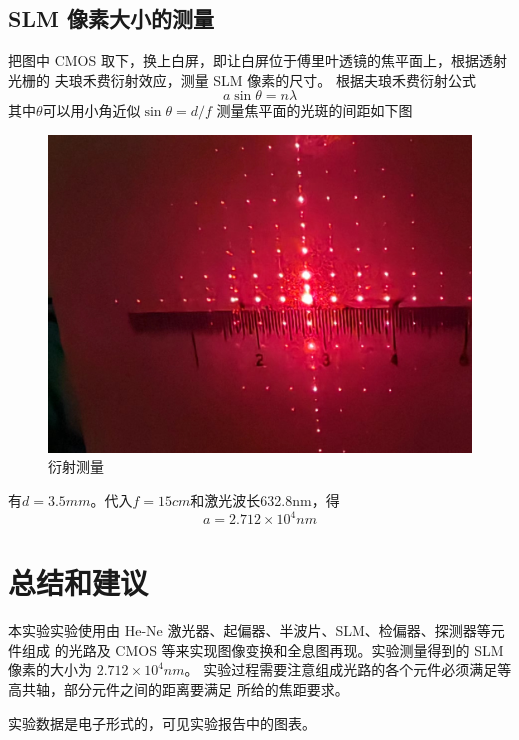 \documentclass[11pt,a4paper]{article}
\begin{document}
\subsection{SLM 像素大小的测量}
把图中 CMOS 取下，换上白屏，即让白屏位于傅里叶透镜的焦平面上，根据透射光栅的
夫琅禾费衍射效应，测量 SLM 像素的尺寸。
根据夫琅禾费衍射公式
\begin{equation}
    a\sin{\theta}=n\lambda
\end{equation}
其中$\theta$可以用小角近似$\sin{\theta}=d/f$
测量焦平面的光斑的间距如下图

\begin{figure}[H]
    \centering
    \includegraphics[width=\textwidth]{衍射测量.jpg}
    \caption{衍射测量}
    \label{fig:diffraction-measurement}
    \end{figure}

有$d=3.5mm$。代入$f=15cm$和激光波长632.8nm，得
\begin{equation}
    a=2.712\times 10^4nm
\end{equation}

\section{总结和建议}
本实验实验使用由 He-Ne 激光器、起偏器、半波片、SLM、检偏器、探测器等元件组成
的光路及 CMOS 等来实现图像变换和全息图再现。实验测量得到的 SLM 像素的大小为
$2.712\times 10^4nm$。
实验过程需要注意组成光路的各个元件必须满足等高共轴，部分元件之间的距离要满足
所给的焦距要求。

实验数据是电子形式的，可见实验报告中的图表。
\end{document}
